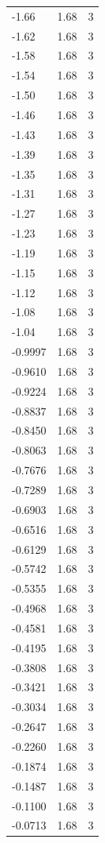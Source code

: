 \begin{longtable}{lrr}
  -1.66 & 1.68 & 3 \\
  -1.62 & 1.68 & 3 \\
  -1.58 & 1.68 & 3 \\
  -1.54 & 1.68 & 3 \\
  -1.50 & 1.68 & 3 \\
  -1.46 & 1.68 & 3 \\
  -1.43 & 1.68 & 3 \\
  -1.39 & 1.68 & 3 \\
  -1.35 & 1.68 & 3 \\
  -1.31 & 1.68 & 3 \\
  -1.27 & 1.68 & 3 \\
  -1.23 & 1.68 & 3 \\
  -1.19 & 1.68 & 3 \\
  -1.15 & 1.68 & 3 \\
  -1.12 & 1.68 & 3 \\
  -1.08 & 1.68 & 3 \\
  -1.04 & 1.68 & 3 \\
  -0.9997 & 1.68 & 3 \\
  -0.9610 & 1.68 & 3 \\
  -0.9224 & 1.68 & 3 \\
  -0.8837 & 1.68 & 3 \\
  -0.8450 & 1.68 & 3 \\
  -0.8063 & 1.68 & 3 \\
  -0.7676 & 1.68 & 3 \\
  -0.7289 & 1.68 & 3 \\
  -0.6903 & 1.68 & 3 \\
  -0.6516 & 1.68 & 3 \\
  -0.6129 & 1.68 & 3 \\
  -0.5742 & 1.68 & 3 \\
  -0.5355 & 1.68 & 3 \\
  -0.4968 & 1.68 & 3 \\
  -0.4581 & 1.68 & 3 \\
  -0.4195 & 1.68 & 3 \\
  -0.3808 & 1.68 & 3 \\
  -0.3421 & 1.68 & 3 \\
  -0.3034 & 1.68 & 3 \\
  -0.2647 & 1.68 & 3 \\
  -0.2260 & 1.68 & 3 \\
  -0.1874 & 1.68 & 3 \\
  -0.1487 & 1.68 & 3 \\
  -0.1100 & 1.68 & 3 \\
  -0.0713 & 1.68 & 3 \\

\end{longtable}
